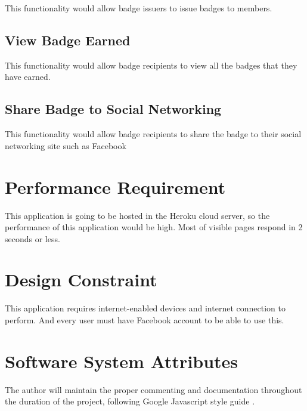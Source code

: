 This functionality would allow badge issuers to issue badges to members. 

\subsection{View Badge Earned}

This functionality would allow badge recipients to view all the badges that they have earned.

\subsection{Share Badge to Social Networking} 

This functionality would allow badge recipients to share the badge to their social networking site such as Facebook

\section{Performance Requirement}

This application is going to be hosted in the Heroku cloud server, so the performance of this application would be high. Most of visible pages respond in 2 seconds or less.
 
\section{Design Constraint}

This application requires internet-enabled devices and internet connection to perform. And every user must have Facebook account to be able to use this. 

\section{Software System Attributes}

The author will maintain the proper commenting and documentation throughout the duration of the project, following Google Javascript style guide \cite{googleguide}. 
